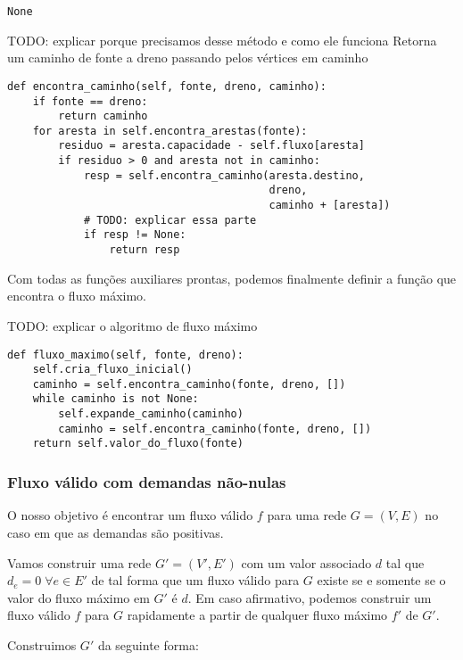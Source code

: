 \documentclass[11pt]{article}
\begin{document}
\begin{verbatim}
None
\end{verbatim}

TODO: explicar porque precisamos desse método e como ele funciona
Retorna um caminho de fonte a dreno passando pelos vértices
em caminho
\begin{verbatim}
def encontra_caminho(self, fonte, dreno, caminho):
    if fonte == dreno:
        return caminho
    for aresta in self.encontra_arestas(fonte):
        residuo = aresta.capacidade - self.fluxo[aresta]
        if residuo > 0 and aresta not in caminho:
            resp = self.encontra_caminho(aresta.destino,
                                         dreno,
                                         caminho + [aresta])
            # TODO: explicar essa parte
            if resp != None:
                return resp
\end{verbatim}

Com todas as funções auxiliares prontas, podemos finalmente definir a
função que encontra o fluxo máximo.

TODO: explicar o algoritmo de fluxo máximo
\begin{verbatim}
def fluxo_maximo(self, fonte, dreno):
    self.cria_fluxo_inicial()
    caminho = self.encontra_caminho(fonte, dreno, [])
    while caminho is not None:
        self.expande_caminho(caminho)
        caminho = self.encontra_caminho(fonte, dreno, [])
    return self.valor_do_fluxo(fonte)
\end{verbatim}

\subsubsection{Fluxo válido com demandas não-nulas}
\label{sec-3-3-2}

O nosso objetivo é encontrar um fluxo válido $f$ para uma rede $G =
(V, E)$ no caso em que as demandas são positivas.

Vamos construir uma rede $G' = (V', E')$ com um valor associado $d$
tal que $d_e = 0 \; \forall e \in E'$ de tal forma que um fluxo válido
para $G$ existe se e somente se o valor do fluxo máximo em $G'$ é
$d$. Em caso afirmativo, podemos construir um fluxo válido $f$ para
$G$ rapidamente a partir de qualquer fluxo máximo $f'$ de $G'$.

Construimos $G'$ da seguinte forma:
\end{document}
